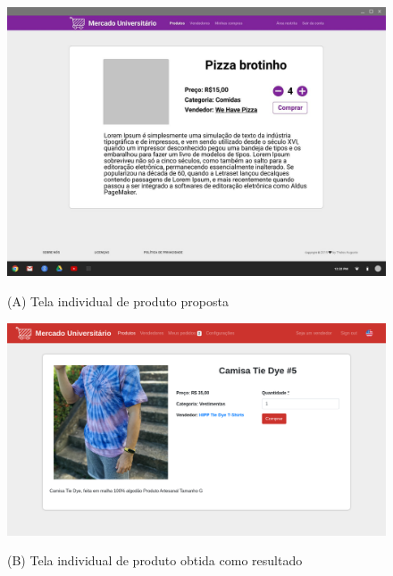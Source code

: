 \begin{figure}[htbp!]
  \centering
  \caption{(A) Tela individual de produto proposta}
  \includegraphics[width=1\textwidth]{figs/mockup/produto.jpg}
    \label{fig:mockup_produto}
\end{figure}

\begin{figure}[htbp!]
  \centering
  \caption{(B) Tela individual de produto obtida como resultado}
  \includegraphics[width=1\textwidth]{figs/resultado/produto.png}
    \label{fig:real_produto}
\end{figure}

